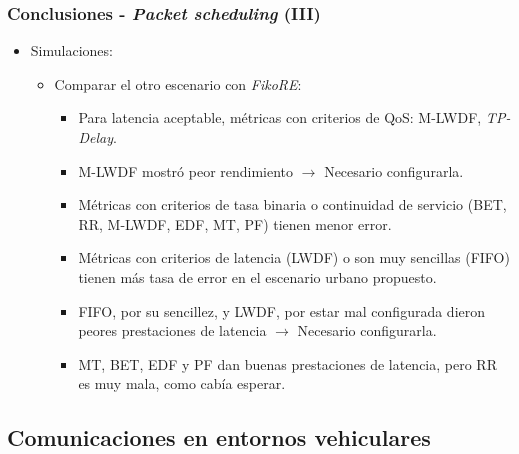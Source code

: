 \documentclass{beamer}
\begin{document}
\begin{frame}
\frametitle{Conclusiones - \textit{Packet scheduling} (III)}

\begin{itemize}
\item {
	Simulaciones:
	\begin{itemize}
	\item {
		Comparar el otro escenario con \textit{FikoRE}:
		\begin{itemize}
		\item Para latencia aceptable, métricas con criterios de QoS: M-LWDF, \textit{TP-Delay}.
		\item M-LWDF mostró peor rendimiento $\rightarrow$ Necesario configurarla.
		\item Métricas con criterios de tasa binaria o continuidad de servicio (BET, RR, M-LWDF, EDF, MT, PF) tienen menor error.
		\item Métricas con criterios de latencia (LWDF) o son muy sencillas (FIFO) tienen más tasa de error en el escenario urbano propuesto.
		\item FIFO, por su sencillez, y LWDF, por estar mal configurada dieron peores prestaciones de latencia $\rightarrow$ Necesario configurarla.
		\item MT, BET, EDF y PF dan buenas prestaciones de latencia, pero RR es muy mala, como cabía esperar.
		\end{itemize}
	}
	\end{itemize}
}
\end{itemize}
\end{frame}

\subsection{Comunicaciones en entornos vehiculares}
\end{document}
